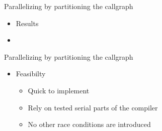 \begin{frame}{Parallelizing by partitioning the callgraph}
\begin{itemize}
    \item Results
    \item[]

\begin{center}
\end{center}
\end{itemize}
\end{frame}


\begin{frame}{Parallelizing by partitioning the callgraph}

\begin{itemize}
    \item Feasibilty
    \begin{itemize}
        \item Quick to implement
        \item Rely on tested serial parts of the compiler
        \item No other race conditions are introduced
    \end{itemize}
\end{itemize}
\end{frame}


